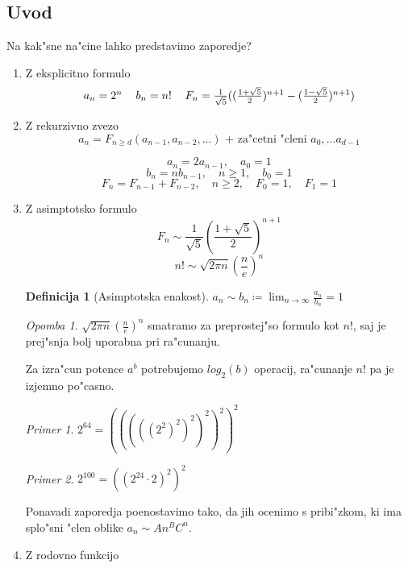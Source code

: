 \documentclass[a4paper,12pt]{article}
\theoremstyle{definition}
\newtheorem{defn}[counter]{Definicija}
\theoremstyle{remark}
\newtheorem*{ex}{Primer}
\newtheorem*{rem}{Opomba}
\begin{document}
\subsection{Uvod}
Na kak"sne na"cine lahko predstavimo zaporedje?
\begin{enumerate}
    \item Z eksplicitno formulo
    \[\begin{tabular}{c c c}
    $a_n = 2^n$ & $b_n = n!$ & $F_n = \frac{1}{\sqrt{5}}((\frac{1 + \sqrt{5}}{2})^{n + 1} - (\frac{1 - \sqrt{5}}{2})^{n + 1})$
    \end{tabular}\]
    \item Z rekurzivno zvezo
    \[a_n = F_{n \geqslant d} (a_{n - 1}, a_{n - 2}, ...)\text{ + za"cetni "cleni }a_0, ... a_{d - 1}\]

    \[a_n = 2a_{n-1}, \quad a_0 = 1\]
    \[b_n = nb_{n - 1}, \quad n \geqslant 1, \quad b_0 = 1\]
    \[F_n = F_{n - 1} + F_{n - 2}, \quad n \geqslant 2, \quad F_0 = 1, \quad F_1 = 1\]

    \item Z asimptotsko formulo
    \[F_n \sim \frac{1}{\sqrt{5}}(\frac{1 + \sqrt{5}}{2})^{n + 1}\]
    \[n! \sim \sqrt{2 \pi n}(\frac{n}{e})^n\]
    \begin{defn}[Asimptotska enakost]
    	$a_n \sim b_n \coloneqq \lim_{n \to \infty} \frac{a_n}{b_n} = 1$
    \end{defn}
    \begin{rem}
    	$\sqrt{2 \pi n}(\frac{n}{e})^n$ smatramo za preprostej"so formulo kot $n!$, saj je prej"snja bolj uporabna pri ra"cunanju.
    \end{rem}
	Za izra"cun potence $a^b$ potrebujemo $log_2(b)$ operacij, ra"cunanje $n!$ pa je izjemno po"casno.
	\begin{ex}
		$2^{64} = (((((2^2)^2)^2)^2)^2)^2$
	\end{ex}
	\begin{ex}
		$2^{100} = ((2^{24} \cdot 2)^2)^2$
	\end{ex}
    Ponavadi zaporedja poenostavimo tako, da jih ocenimo s pribi"zkom, ki ima splo"sni "clen oblike $a_n \sim A n^B C^n$.

    \item Z rodovno funkcijo


\end{enumerate}
\end{document}

